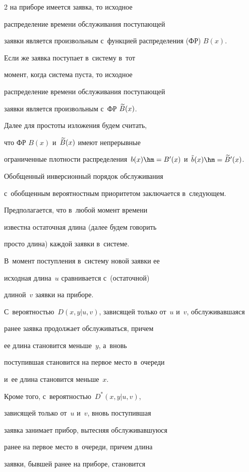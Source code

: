 \begin{multicols}{2}
на приборе имеется заявка, то исходное


распределение времени обслуживания поступающей


заявки является произвольным с~функцией распределения (ФР) $B(x)$.


Если же заявка поступает в~систему в~тот


момент, когда система пуста, то исходное


распределение времени обслуживания поступающей


заявки является произвольным с~ФР $\widetilde B(x)$.





Далее для простоты изложения будем считать,


что ФР $B(x)$ и~$\widetilde B(x)$ имеют непрерывные


ограниченные плотности распределения~$b(x)\hm=B'(x)$ и~$\tb(x)\hm=\tB'(x)$.





Обобщенный инверсионный порядок обслуживания


с~обобщенным вероятностным приоритетом заключается в~следующем.


Предполагается, что в~любой момент времени


известна остаточная длина (далее будем говорить


просто длина) каждой заявки в~системе.


В~момент поступления в~систему новой заявки ее


исходная длина~$u$ сравнивается с~(остаточной)


длиной~$v$ заявки на приборе.


С~вероятностью~$D(x,y|u,v)$, зависящей только от~$u$ и~$v$, обслуживавшаяся


ранее заявка продолжает обслуживаться, причем


ее длина становится меньше~$y$, а~вновь


поступившая становится на первое место в~очереди


и~ее длина становится меньше~$x$.


Кроме того, с~вероятностью~$D^*(x,y|u,v)$,


зависящей только от~$u$ и~$v$, вновь поступившая


заявка занимает прибор, вытесняя обслуживавшуюся


ранее на первое место в~очереди, причем длина


заявки, бывшей ранее на приборе, становится



\end{multicols}
